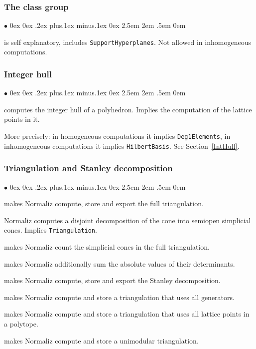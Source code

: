 \documentclass[12pt,a4paper]{scrartcl}
\newcommand{\stdli}{ \topsep0ex \partopsep0ex %
\parsep.2ex plus.1ex minus.1ex \itemsep0ex%
\leftmargin2.5em \labelwidth2em \labelsep.5em \rightmargin0em}%
\renewenvironment{itemize}{\begin{list}{{$\bullet$}}{\stdli}}{\end{list}}
\theoremstyle{definition}
\def\itemtt[#1]{\item[\textbf{\ttt{#1}}]}
\def\ttt{\texttt}
\begin{document}
\subsubsection{The class group}

\begin{itemize}
	\itemtt [ClassGroup, -C] is self explanatory, includes \verb|SupportHyperplanes|. Not allowed in inhomogeneous computations.
\end{itemize}

\subsubsection{Integer hull}

\begin{itemize}
	\itemtt [IntegerHull, -H] computes the integer hull of a polyhedron. Implies the computation of the lattice points in it.
\end{itemize}

More precisely: in homogeneous computations it implies \verb|Deg1Elements|, in inhomogeneous computations it implies \verb|HilbertBasis|. See Section~\ref{IntHull}.

\subsubsection{Triangulation and Stanley decomposition}

\begin{itemize}
	
	\itemtt[Triangulation, -T] makes Normaliz compute, store and export the full triangulation.
	
	\itemtt[ConeDecomposition, -D] Normaliz computes a disjoint decomposition of the cone into semiopen simplicial cones. Implies \verb|Triangulation|.
	
	\itemtt[TriangulationSize, -t] makes Normaliz count the simplicial cones in the full triangulation.
	
	\itemtt[TriangulationDetSum] makes Normaliz additionally sum the absolute values of their determinants.
	
	\itemtt[StanleyDec, -y] makes Normaliz compute, store and export the Stanley decomposition.
	
	\itemtt[AllGeneratorsTriangulation] makes Normaliz compute and store a triangulation that uses all generators.
	
	\itemtt[LatticePointTriangulation] makes Normaliz compute and store a triangulation that uses all lattice points in a polytope.
	
	\itemtt[UnimodularTriangulation] makes Normaliz compute and store a unimodular triangulation.
	
\end{itemize}
\end{document}
